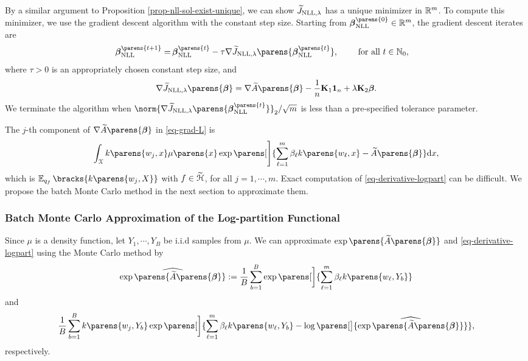 By a similar argument to Proposition \ref{prop-nll-sol-exist-unique}, we can show $\widetilde{J}_{\mathrm{NLL}, \lambda}$ has a unique minimizer in $\mathbb{R}^m$. To compute this minimizer, we use the gradient descent algorithm with the constant step size. Starting from $\bbeta_{\NLL}^{\parens{0}} \in \Real^{m}$, the gradient descent iterates are 
\begin{align*}
	\bbeta_{\NLL}^{\parens{t+1}} = & \, \bbeta_{\NLL}^{\parens{t}} - \tau \nabla \widetilde{J}_{\NLL, \lambda} \parens{\bbeta_{\NLL}^{\parens{t}}}, \qquad \text{ for all } t \in \Natural_0, 
\end{align*}
where $\tau > 0$ is an appropriately chosen constant step size, and 
\begin{align}\label{eq-grad-L}
	\nabla \widetilde{J}_{\NLL, \lambda} \parens{\bbeta} = \nabla \widetilde{A} \parens{\bbeta} - \frac{1}{n} \bK_1 \boldone_n + \lambda \bK_2 \bbeta. 
\end{align}
We terminate the algorithm when 
$\norm{\nabla \widetilde{J}_{\NLL, \lambda} \parens{\bbeta_{\NLL}^{\parens{t}}}}_2 / \sqrt{m}$ is less than a pre-specified tolerance parameter. 

The $j$-th component of $\nabla \widetilde{A} \parens{\bbeta}$ in \eqref{eq-grad-L} is 
\begin{align}\label{eq-derivative-logpart}
	\int_{\calX} k \parens{w_j, x} \mu \parens{x} \exp \parens[\Bigg]{\sum_{\ell=1}^m \beta_{\ell} k \parens{w_{\ell}, x} - \widetilde{A} \parens{\bbeta}} \diff x, 
\end{align}
which is $\E_{q_{f}} \bracks{k \parens{w_j, X}}$ with $f \in \widetilde{\mathcal{H}}$, for all $j = 1, \cdots, m$. Exact computation of \eqref{eq-derivative-logpart} can be difficult. We propose the batch Monte Carlo method in the next section to approximate them. 

\subsubsection{Batch Monte Carlo Approximation of the Log-partition Functional}

Since $\mu$ is a density function, let $Y_1, \cdots, Y_B$ be i.i.d samples from $\mu$. We can approximate $\exp \parens{\widetilde{A} \parens{\bbeta}}$ and \eqref{eq-derivative-logpart} using the Monte Carlo method by 
\begin{align}\label{eq-mc-approx-A}
	\widehat{\exp \parens{\widetilde{A} \parens{\bbeta}}} := \frac{1}{B} \sum_{b=1}^B \exp \parens[\bigg]{\sum_{\ell=1}^m \beta_{\ell} k \parens{w_\ell, Y_b} }
\end{align}
and 
\begin{align}\label{eq-mc-approx}
	\frac{1}{B} \sum_{b=1}^B k \parens{w_{j}, Y_{b}} \exp \parens[\bigg]{\sum_{\ell=1}^m \beta_{\ell} k \parens{w_\ell, Y_b } - \log \parens[\big]{\widehat{\exp \parens{\widetilde{A} \parens{\bbeta}}}} }, 
\end{align}
respectively. 

